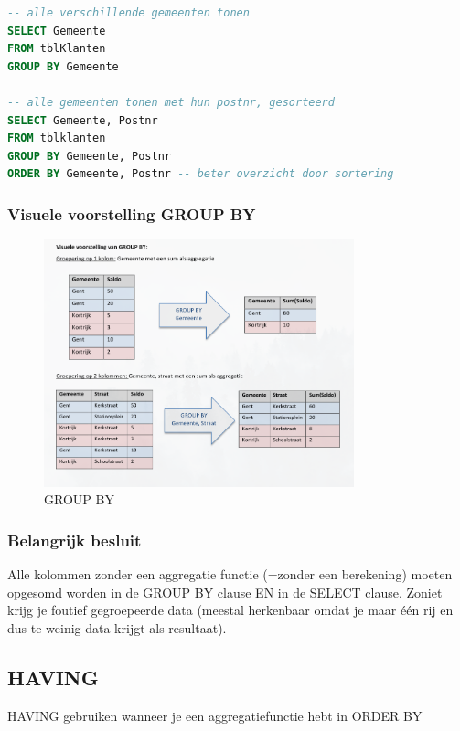 \documentclass{article}
\begin{document}
\begin{lstlisting}[language=SQL]
-- alle verschillende gemeenten tonen
SELECT Gemeente 
FROM tblKlanten 
GROUP BY Gemeente

-- alle gemeenten tonen met hun postnr, gesorteerd
SELECT Gemeente, Postnr
FROM tblklanten 
GROUP BY Gemeente, Postnr
ORDER BY Gemeente, Postnr -- beter overzicht door sortering
\end{lstlisting}

\subsubsection{Visuele voorstelling GROUP BY}

\begin{figure}[H]
    \centering
    \includegraphics[width=0.8\textwidth]{Screenshot_20200219_154054.png}
    \caption{GROUP BY}
\end{figure}

\subsubsection{Belangrijk besluit}
Alle kolommen zonder een aggregatie functie (=zonder een berekening) moeten opgesomd worden in de  GROUP  BY  clause EN  in de  SELECT  clause.  Zoniet  krijg  je  foutief  gegroepeerde  data  (meestal  herkenbaar  omdat je maar één rij en dus te weinig data krijgt als resultaat).

\subsection{HAVING}
HAVING gebruiken wanneer je een aggregatiefunctie hebt in ORDER BY
\end{document}
